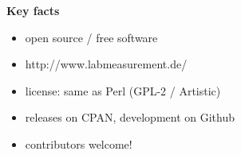 \documentclass[portrait]{a0poster}
\newcommand{\heading}[1]{
  {\color{heading}\boldmath\textbf{\huge #1}}\\[\medskipamount]
}
\begin{document}
{\begin{minipage}[t][\columnheighta-2\fboxsep-2\fboxrule][t]
\begin{minipage}{\textwidth}
\vspace*{2cm}
\heading{Key facts}
\vspace*{-2cm}
\begin{itemize}
 \item
 open source / free software\\[-5cm]
 \item 
 http://www.labmeasurement.de/
 \hfill{}
 \item
 license: same as Perl (GPL-2 / Artistic)
 \item
 releases on CPAN, development on Github
 \item
 contributors welcome!
\end{itemize}






%
%
%
%
\end{minipage}
\end{minipage}}
%
%
%
%
%
\end{document}
